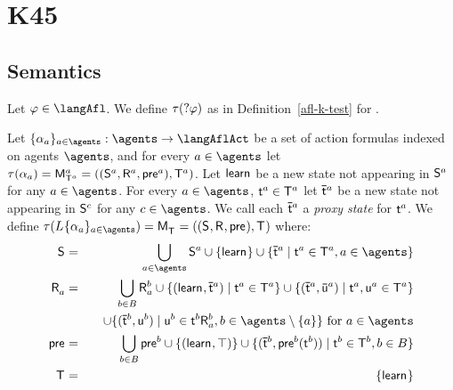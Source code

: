 \section{K45}

\subsection{Semantics}

\begin{definition}[Test]\label{afl-kff-test}
Let $\phi \in \langAfl$.
We define $\tau(\test{\phi})$ as in Definition~\ref{afl-k-test} for \classK{}.
\end{definition}

\begin{definition}[Learning]\label{afl-kff-learning}
Let $\{\alpha_\agentA\}_{\agentA \in \agents} : \agents \to \langAflAct$ be a set of action formulas indexed on agents $\agents$, and for every $\agentA \in \agents$ let $\tau(\alpha_\agentA) = \aPModel[\agentA]{\aStatesT[\agentA]} = \aPModelTuple[\agentA]{\aStatesT[\agentA]}$.
Let $\aStateLearn$ be a new state not appearing in $\aStates[\agentA]$ for any $\agentA \in \agents$.
For every $\agentA \in \agents$, $\aStateT[\agentA] \in \aStatesT[\agentA]$ let $\aPStateT[\agentA]$ be a new state not appearing in $\aStates[\agentC]$ for any $\agentC \in \agents$.
We call each $\aPStateT[\agentA]$ a {\em proxy state} for $\aStateT[\agentA]$.
We define $\tau(\learns \{\alpha_\agentA\}_{\agentA \in \agents}) = \aPModel{\aStatesT} = \aPModelTuple{\aStatesT}$ where:
\begin{eqnarray*}
    \aStates &=& \bigcup_{\agentA \in \agents} \aStates[\agentA] \cup \{\aStateLearn\} \cup \{\aPStateT[\agentA] \mid \aStateT[\agentA] \in \aStatesT[\agentA], \agentA \in \agents\}\\
    \aAccessibility{\agentA} &=& \bigcup_{\agentB \in \agentsB} \aAccessibility[\agentB]{\agentA} \cup \{(\aStateLearn, \aPStateT[\agentA]) \mid \aStateT[\agentA] \in \aStatesT[\agentA]\} \cup \{(\aPStateT[\agentA], \aPStateU[\agentA]) \mid \aStateT[\agentA], \aStateU[\agentA] \in \aStatesT[\agentA]\} \\&& \quad \cup \{(\aPStateT[\agentB], \aStateU[\agentB]) \mid \aStateU[\agentB] \in \aSuccessorsA[\agentB]{\aStateT[\agentB]}, \agentB \in \agents \setminus \{\agentA\}\} \text{ for } \agentA \in \agents\\
    \aPrecondition &=& \bigcup_{\agentB \in \agentsB} \aPrecondition[\agentB] \cup \{(\aStateLearn, \top)\} \cup \{(\aPStateT[\agentB], \aPrecondition[\agentB](\aStateT[\agentB])) \mid \aStateT[\agentB] \in \aStatesT[\agentB], \agentB \in \agentsB\}\\
    \aStatesT &=& \{\aStateLearn\}
\end{eqnarray*}
\end{definition}

